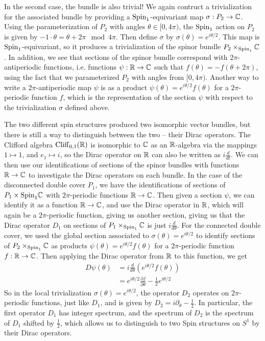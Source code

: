 \begin{exmp}
In the second case, the bundle is also trivial! We again contruct a trivialization
for the associated bundle by providing a $\mathrm{Spin}_1$-equivariant map
$\sigma : P_2 \to \mathbb{C}$. Using the parameterization of $P_2$ with angles
$\theta \in [0,4\pi)$, the $\mathrm{Spin}_1$ action on $P_2$ is given by
$-1 \cdot \theta = \theta + 2\pi \mod 4\pi$. Then define $\sigma$ by
$\sigma(\theta) = e^{i\theta/2}$. This map is $\mathrm{Spin}_1$-equivariant, so
it produces a trivialization of the spinor bundle $P_2 \times_{\mathrm{Spin}_1} \mathbb{C}$.
In addition, we see that sections of the spinor bundle correspond
with $2\pi$-antiperiodic functions, i.e. functions $\psi : \mathbb{R} \to \mathbb{C}$ such that
$f(\theta) = -f(\theta + 2\pi)$, using the fact that we parameterized $P_2$
with angles from $[0, 4\pi)$. Another way to write a $2\pi$-antiperiodic map
$\psi$ is as a product $\psi(\theta) = e^{i\theta/2}f(\theta)$ for a $2\pi$-periodic
function $f$, which is the representation of the section $\psi$ with respect to the
trivialization $\sigma$ defined above.

The two different spin structures produced two isomorphic vector bundles,
but there is still a way to distinguish between the two -- their Dirac operators.
The Clifford algebra $\operatorname{Cliff}_{0,1}(\mathbb{R})$ is isomorphic to $\mathbb{C}$ as an $\mathbb{R}$-algebra
via the mappings $1 \mapsto 1$, and $e_1 \mapsto i$, so the Dirac operator on
$\mathbb{R}$ can also be written as $i \frac{d}{dt}$. We can then use our identifications
of sections of the spinor bundles with functions $\mathbb{R} \to \mathbb{C}$ to investigate the
Dirac operators on each bundle. In the case of the disconnected double cover $P_1$,
we have the identifications of sections of $P_1 \times{\mathrm{Spin}_1} \mathbb{C}$ with
$2\pi$-periodic functions $\mathbb{R} \to \mathbb{C}$. Then given a section $\psi$, we
can identify it as a function $\mathbb{R} \to \mathbb{C}$, and use the Dirac operator in $\mathbb{R}$,
which will again be a $2\pi$-periodic function, giving us another section,
giving us that the Dirac operator $D_1$ on sections of $P_1 \times_{\mathrm{Spin}_1} \mathbb{C}$
is just $i\frac{d}{d\theta}$. For the connected double cover, we used the
global section associated to $\sigma(\theta) = e^{i\theta /2}$ to identify
sections of $P_2 \times_{\mathrm{Spin}_1} \mathbb{C}$ as products
$\psi(\theta) = e^{i\theta/2}f(\theta)$ for a $2\pi$-periodic function $f : \mathbb{R} \to \mathbb{C}$.
Then applying the Dirac operator from $\mathbb{R}$ to this function, we get
%
\begin{align*}
D\psi(\theta) &= i\frac{d}{d\theta}\left( e^{i\theta/2}f(\theta) \right) \\
&= e^{i\theta/2}\frac{\partial f}{\partial \theta} - \frac{1}{2}e^{i\theta/2}
\end{align*}
%
So in the local trivialization $\sigma(\theta) = e^{i\theta/2}$, the operator $D_2$
operates on $2\pi$-periodic functions, just like $D_1$, and is given by
$D_2 = i\partial_\theta - \frac{1}{2}$. In particular, the first operator $D_1$ has
integer spectrum, and the spectrum of $D_2$ is the spectrum of $D_1$ shifted by
$\frac{1}{2}$, which allows us to distinguish to two Spin structures on $S^1$
by their Dirac operators.
%
\end{exmp}
